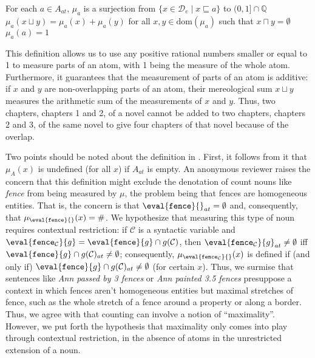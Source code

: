 \documentclass[output=paper]{langscibook}
\begin{document}
\ea \label{hai-tri:mu-a}
For each $a \in A_{at}$, 
\ea $\mu_a$ is a surjection from $\{x\in{\mathcal D}_e\mid x\sqsubseteq a\}$ to $(0,1] \cap\mathbb{Q}$
\ex $\mu_a(x\sqcup y) = \mu_a(x)+\mu_a(y)$ for all $x,y\in\mbox{dom}(\mu_a)$ such that $x\sqcap y=\emptyset$ \label{hai-tri:mu-a-b}
\ex $\mu_a(a)=1$
\z
\z

\noindent This definition allows us to use any positive rational numbers smaller or equal to 1 to measure parts of an atom, with 1 being the measure of the whole atom. Furthermore, it guarantees that the measurement of parts of an atom is additive: if $x$ and $y$ are non-overlapping parts of an atom, their mereological sum $x\sqcup y$ measures the arithmetic sum of the measurements of $x$ and $y$. Thus, two chapters, chapters 1 and 2, of a novel cannot be added to two chapters, chapters 2 and 3, of the same novel to give four chapters of that novel because of the overlap.

Two points should be noted about the definition in . First, it follows from it that $\mu_A(x)$ is undefined (for all $x$) if $A_{at}$ is empty. An anonymous reviewer raises the concern that this definition might exclude the denotation of count nouns like \textit{fence} from being measured by $\mu$, the problem being that fences are homogeneous entities. That is, the concern is that $\eval{\texttt{fence}}{}_{at} = \emptyset$ and, consequently, that $\mu_{\eval{\texttt{fence}}{}}(x) = \#$. We hypothesize that measuring this type of noun requires contextual restriction: if ${\mathcal C}$ is a syntactic variable and $\eval{\texttt{fence}_{\mathcal C}}{g} = \eval{\texttt{fence}}{g} \cap g({\mathcal C})$, then $\eval{\texttt{fence}_{\mathcal C}}{g}_{at} \ne \emptyset$ iff $\eval{\texttt{fence}}{g} \cap g({\mathcal C})_{at} \ne \emptyset$; consequently, $\mu_{\eval{\texttt{fence}_{\mathcal C}}{}}(x)$ is defined if (and only if) $\eval{\texttt{fence}}{g} \cap g({\mathcal C})_{at} \ne \emptyset$ (for certain $x$). Thus, we surmise that sentences like \textit{Ann passed by 3 fences} or \textit{Ann painted 3.5 fences} presuppose a context in which fences aren't homogeneous entities but maximal stretches of fence, such as the whole stretch of a fence around a property or along a border. Thus, we agree with \citet{wagiel2018thesis} that counting can involve a notion of ``maximality''. However, we put forth the hypothesis that maximality only comes into play through contextual restriction, in the absence of atoms in the unrestricted extension of a noun. 
\end{document}
